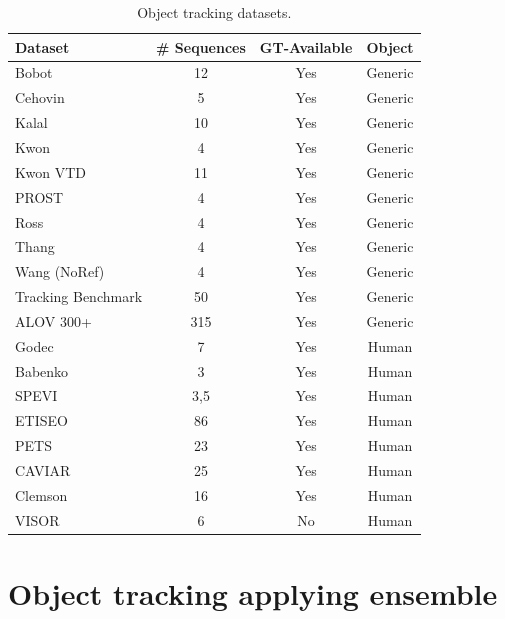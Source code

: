 \begin{table}[t!]
\centering
\begin{tabular}{lccc}
\toprule
\textbf{Dataset} & \textbf{\# Sequences} & \textbf{GT-Available} &
\textbf{Object} \\ \midrule
Bobot \cite{KleinIROS10}          & 12       & Yes & Generic \\
Cehovin \cite{Cehovin2013}        & 5        & Yes & Generic \\
Kalal \cite{Kalal2011}            & 10       & Yes & Generic \\
Kwon \cite{Kwon2009}               & 4        & Yes & Generic \\
Kwon VTD \cite{Kwon2011a}           & 11       & Yes & Generic \\
PROST \cite{Santner2010a}         & 4        & Yes & Generic \\
Ross \cite{Ross2007}              & 4        & Yes & Generic \\
Thang \cite{Dinh2011}             & 4        & Yes & Generic \\
Wang (NoRef)                      & 4        & Yes & Generic \\
Tracking Benchmark \cite{Wu2013B} & 50       & Yes & Generic \\
ALOV 300+ \cite{Smeulders2014}    & 315      & Yes & Generic \\
Godec \cite{godec11a}             & 7        & Yes & Human   \\
Babenko \cite{Babenko2010}        & 3        & Yes & Human   \\
SPEVI \cite{Maggio2005}           & 3,5      & Yes & Human   \\
ETISEO \cite{Munder2006}          & 86       & Yes & Human   \\
PETS \cite{PETS}                  & 23 		 & Yes & Human   \\
CAVIAR \cite{Torralba2003}        & 25   	 & Yes & Human   \\
Clemson \cite{Birchfield1998}     & 16       & Yes & Human   \\
VISOR \cite{Vezzani2010}          & 6        & No  & Human   \\
\bottomrule
\end{tabular}
\caption{Object tracking datasets.}
\label{table:datasets}
\end{table}

\section{Object tracking applying ensemble}
\label{sec::ensemble}

